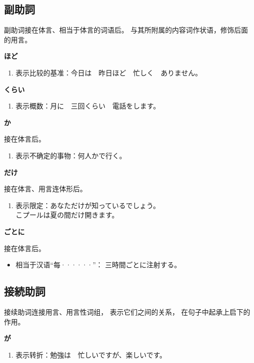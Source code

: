 \subsection{副助詞}%

副助词接在体言、相当于体言的词语后。
与其所附属的内容词作状语，修饰后面的用言。

{\bf
\noindent ほど
}

\begin{enumerate}
  \item 表示比较的基准：今日は　昨日ほど　忙しく　ありません。
\end{enumerate}

{\bf
\noindent くらい 
}

\begin{enumerate}
  \item 表示概数：月に　三回くらい　電話をします。
\end{enumerate}

{\bf
\noindent か
}

接在体言后。
\begin{enumerate}
  \item 表示不确定的事物：何人かで行く。
\end{enumerate}

{\bf
\noindent だけ
}

接在体言、用言连体形后。
\begin{enumerate}
  \item 表示限定：あなただけが知っているでしょう。\\
    こプールは夏の間だけ開きます。
\end{enumerate}

{\bf
\noindent ごとに
}

接在体言后。
\begin{itemize}
  \item 相当于汉语``每······''： 三時間ごとに注射する。
\end{itemize}


\subsection{接続助詞}%

接续助词连接用言、用言性词组，
表示它们之间的关系，
在句子中起承上启下的作用。

{\bf
\noindent が
}

\begin{enumerate}
  \item 表示转折：勉強は　忙しいですが、楽しいです。
\end{enumerate}

